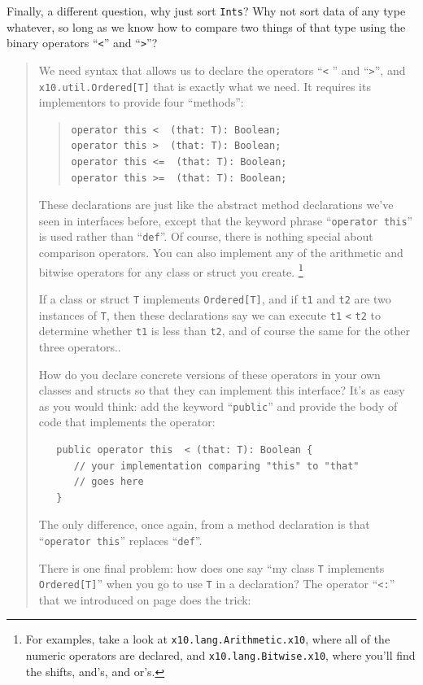 \begin{finepoint}
Finally, a different question, why just sort {\tt Ints}? 
Why not sort data of any type whatever, so long as we know how to compare
two things of that type using the  binary operators ``{\tt <}'' and ``{\tt >}''?   
\begin{quote} 
We need syntax that allows us to declare the operators ``{\tt <} '' and ``{\tt >}'',
and  {\tt x10.util.Ordered[T]} that is exactly what we need.
It requires its implementors to provide four ``methods'':
\begin{quote}
\begin{verbatim}
operator this <  (that: T): Boolean;
operator this >  (that: T): Boolean;
operator this <=  (that: T): Boolean;
operator this >=  (that: T): Boolean;
\end{verbatim}
\end{quote}
These declarations are just like the abstract method declarations we've seen in interfaces
before, except that the keyword phrase ``{\tt operator this}'' 
is used rather than ``{\tt def}''.  Of course, there is nothing special about comparison
operators.  You can also implement any of the arithmetic and bitwise operators for
any class or struct you create.
\footnote{
For examples, take a look at {\tt x10.lang.Arithmetic.x10}, where all
of the numeric operators are declared, and {\tt x10.lang.Bit\-wise.x10}, where you'll
find the shifts, and's, and or's. 
}

If a class or struct {\tt T} implements {\tt Ordered[T]}, and if {\tt t1} and {\tt t2}
are two instances of {\tt T}, then these declarations say we can
execute  {\tt t1} {\tt <} {\tt t2} to determine whether {\tt t1} is less than {\tt t2},
and of course the same for the other three operators..

How do you declare concrete versions of these operators in your own classes
and structs so that they can implement this interface?  It's as easy as you would think:
add the keyword ``{\tt public}'' and provide the body of code that implements the 
operator:
\begin{verbatim}
   public operator this  < (that: T): Boolean {
      // your implementation comparing "this" to "that"
      // goes here
   }
\end{verbatim}
The only difference, once again, from a method declaration is that  ``{\tt operator this}''
replaces ``{\tt def}''.

There is one final problem: how does one say ``my class {\tt T} implements
{\tt Ordered[T]}'' when you go to use {\tt T} in a declaration?
The operator ``{\tt <:}'' that we introduced on page
\pageref{subsub:type:anything} does the trick:


\end{quote}
\end{finepoint}
